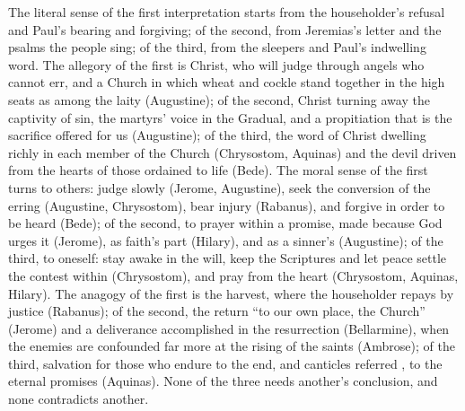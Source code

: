 The literal sense of the first interpretation starts from the householder's
refusal and Paul's bearing and forgiving; of the second, from Jeremias's
letter and the psalms the people sing; of the third, from the sleepers and
Paul's indwelling word. The
allegory of the first is Christ, who will judge through angels who cannot
err, and a Church in which wheat and cockle stand together in the high seats
as among the laity (Augustine); of the second, Christ turning away the
captivity of sin, the martyrs' voice in the Gradual, and a propitiation that
is the sacrifice offered for us (Augustine); of the third, the word of Christ
dwelling richly in each member of the Church (Chrysostom, Aquinas) and the
devil driven from the hearts of those ordained to life (Bede). The moral sense
of the first turns to others: judge slowly (Jerome, Augustine), seek
the conversion of the erring (Augustine, Chrysostom), bear injury (Rabanus),
and forgive in order to be heard (Bede);
of the second, to prayer within a promise, made because God urges it
(Jerome), as faith's part (Hilary), and as a sinner's (Augustine); of the
third, to oneself: stay awake in the will, keep the Scriptures and let
peace settle the contest within (Chrysostom), and pray from the heart
(Chrysostom, Aquinas, Hilary). The anagogy of the first is the
harvest, where the householder repays by justice (Rabanus); of the second, the
return ``to our own place, the Church'' (Jerome) and a deliverance
accomplished in the resurrection (Bellarmine), when the enemies are confounded
far more at the rising of the saints (Ambrose); of the third, salvation for
those who endure to the end, and canticles referred , to the eternal promises (Aquinas). None of the three needs another's
conclusion, and none contradicts another.

